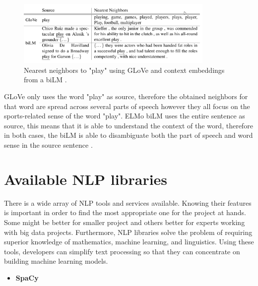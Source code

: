             
        \begin{figure}[H]
            \centering
            \captionsetup{justification=centering}
            \includegraphics[width=0.85\textwidth]{Sections/3StateOfTheArt/3_images/ELMO.png}
            \caption[Nearest neighbors to "play" using GLoVe]{Nearest neighbors to "play" using GLoVe and context embeddings from a biLM \cite{Peters:2018}.} 
            \label{fig:diffe}
        \end{figure}

        \par GLoVe only uses the word "play" as source, therefore the obtained neighbors for that word are spread across several parts of speech however they all focus on the sports-related sense of the word "play". ELMo biLM uses the entire sentence as source, this means that it is able to understand the context of the word, therefore in both cases, the biLM is able to disambiguate both the part of speech and word sense in the source sentence \cite{Peters:2018}.
        

       
\section{Available NLP libraries}
    \label{sec:libraries}

    There is a wide array of NLP tools and services available. Knowing their features is important in order to find the most appropriate one for the project at hands. Some might be better for smaller project and others better for experts working with big data projects. Furthermore, NLP libraries solve the problem of requiring superior knowledge of mathematics, machine learning, and linguistics. Using these tools, developers can simplify text processing so that they can concentrate on building machine learning models. 



        \begin{itemize}
            \item\textbf{SpaCy}
        \end{itemize}
      
